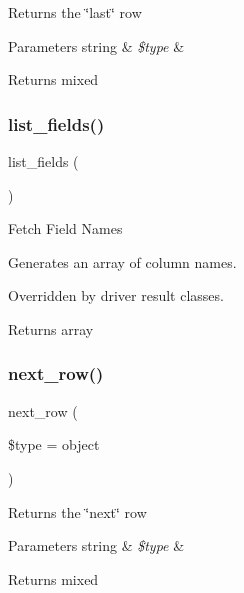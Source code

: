 Returns the \char`\"{}last\char`\"{} row


\begin{DoxyParams}[1]{Parameters}
string & {\em \$type} & \\
\hline
\end{DoxyParams}
\begin{DoxyReturn}{Returns}
mixed 
\end{DoxyReturn}
\mbox{\label{class_c_i___d_b__result_a50b54eb4ea7cfd039740f532988ea776}} 
\subsubsection{\texorpdfstring{list\+\_\+fields()}{list\_fields()}}
{\footnotesize\ttfamily list\+\_\+fields (\begin{DoxyParamCaption}{ }\end{DoxyParamCaption})}

Fetch Field Names

Generates an array of column names.

Overridden by driver result classes.

\begin{DoxyReturn}{Returns}
array 
\end{DoxyReturn}
\mbox{\label{class_c_i___d_b__result_a5664a519252b14c1cdd93d9de0322a9f}} 
\subsubsection{\texorpdfstring{next\+\_\+row()}{next\_row()}}
{\footnotesize\ttfamily next\+\_\+row (\begin{DoxyParamCaption}\item[{}]{\$type = {\ttfamily \textquotesingle{}object\textquotesingle{}} }\end{DoxyParamCaption})}

Returns the \char`\"{}next\char`\"{} row


\begin{DoxyParams}[1]{Parameters}
string & {\em \$type} & \\
\hline
\end{DoxyParams}
\begin{DoxyReturn}{Returns}
mixed 
\end{DoxyReturn}
\mbox{\label{class_c_i___d_b__result_af831bf363e4d7d661a717a4932af449d}} 
